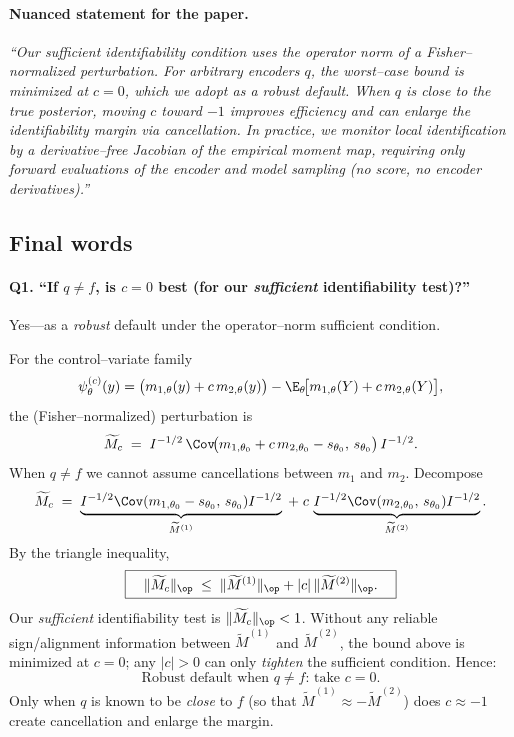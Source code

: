 \paragraph{Nuanced statement for the paper.}
\emph{“Our sufficient identifiability condition uses the operator norm of a Fisher–normalized perturbation. For arbitrary encoders $q$, the worst–case bound is minimized at $c=0$, which we adopt as a robust default. When $q$ is close to the true posterior, moving $c$ toward $-1$ improves efficiency and can enlarge the identifiability margin via cancellation. In practice, we monitor local identification by a derivative–free Jacobian of the empirical moment map, requiring only forward evaluations of the encoder and model sampling (no score, no encoder derivatives).”}


\subsection{Final words}

\paragraph{Q1. “If $q\neq f$, is $c=0$ best (for our \emph{sufficient} identifiability test)?”}
Yes—as a \emph{robust} default under the operator–norm sufficient condition.

For the control–variate family
\[
\psi^{(c)}_\theta(y)
=\big(m_{1,\theta}(y)+c\,m_{2,\theta}(y)\big)
-\E_\theta\!\big[m_{1,\theta}(Y)+c\,m_{2,\theta}(Y)\big],
\]
the (Fisher–normalized) perturbation is
\[
\widetilde M_c \;=\; I^{-1/2}\,\Cov\!\big(m_{1,\theta_0}+c\,m_{2,\theta_0}-s_{\theta_0},\,s_{\theta_0}\big)\,I^{-1/2}.
\]
When $q\neq f$ we cannot assume cancellations between $m_1$ and $m_2$. Decompose
\[
\widetilde M_c \;=\; \underbrace{I^{-1/2}\Cov(m_{1,\theta_0}-s_{\theta_0},\,s_{\theta_0})I^{-1/2}}_{\widetilde M^{(1)}}
\;+\; c\,\underbrace{I^{-1/2}\Cov(m_{2,\theta_0},\,s_{\theta_0})I^{-1/2}}_{\widetilde M^{(2)}}.
\]
By the triangle inequality,
\[
\boxed{\quad \|\widetilde M_c\|_{\op} \;\le\; \|\widetilde M^{(1)}\|_{\op} + |c|\,\|\widetilde M^{(2)}\|_{\op}. \quad}
\]
Our \emph{sufficient} identifiability test is $\|\widetilde M_c\|_{\op}<1$.  
Without any reliable sign/alignment information between $\widetilde M^{(1)}$ and $\widetilde M^{(2)}$, the bound above is minimized at $c=0$; any $|c|>0$ can only \emph{tighten} the sufficient condition. Hence:
\[
\boxed{\text{Robust default when $q\neq f$: take } c=0.}
\]
Only when $q$ is known to be \emph{close} to $f$ (so that $\widetilde M^{(1)}\approx -\widetilde M^{(2)}$) does $c\approx -1$ create cancellation and enlarge the margin.

